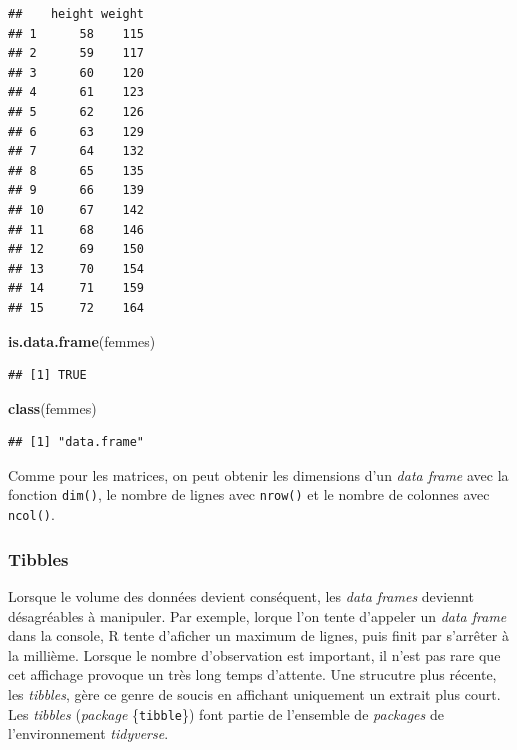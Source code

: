 \documentclass[
  11pt,
]{book}
\newenvironment{Shaded}{\begin{snugshade}}{\end{snugshade}}
\newcommand{\KeywordTok}[1]{\textcolor[rgb]{0.13,0.29,0.53}{\textbf{#1}}}
\newcommand{\NormalTok}[1]{#1}
\numberwithin{equation}{section}
\numberwithin{countremarque}{section}
\begin{document}
\begin{lstlisting}
##    height weight
## 1      58    115
## 2      59    117
## 3      60    120
## 4      61    123
## 5      62    126
## 6      63    129
## 7      64    132
## 8      65    135
## 9      66    139
## 10     67    142
## 11     68    146
## 12     69    150
## 13     70    154
## 14     71    159
## 15     72    164
\end{lstlisting}

\begin{Shaded}
\begin{Highlighting}[]
\KeywordTok{is.data.frame}\NormalTok{(femmes)}
\end{Highlighting}
\end{Shaded}

\begin{lstlisting}
## [1] TRUE
\end{lstlisting}

\begin{Shaded}
\begin{Highlighting}[]
\KeywordTok{class}\NormalTok{(femmes)}
\end{Highlighting}
\end{Shaded}

\begin{lstlisting}
## [1] "data.frame"
\end{lstlisting}

Comme pour les matrices, on peut obtenir les dimensions d'un \emph{data frame} avec la fonction \texttt{dim()}, le nombre de lignes avec \texttt{nrow()} et le nombre de colonnes avec \texttt{ncol()}.

\hypertarget{donees-tibbles}{%
\subsubsection{Tibbles}\label{donees-tibbles}}

Lorsque le volume des données devient conséquent, les \emph{data frames} deviennt désagréables à manipuler. Par exemple, lorque l'on tente d'appeler un \emph{data frame} dans la console, R tente d'aficher un maximum de lignes, puis finit par s'arrêter à la millième. Lorsque le nombre d'observation est important, il n'est pas rare que cet affichage provoque un très long temps d'attente. Une strucutre plus récente, les \emph{tibbles}, gère ce genre de soucis en affichant uniquement un extrait plus court. Les \emph{tibbles} (\emph{package} \{\texttt{tibble}\}) font partie de l'ensemble de \emph{packages} de l'environnement \emph{tidyverse}.
\end{document}
